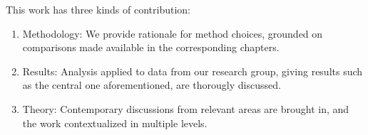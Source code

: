 This work has three kinds of contribution: 
\begin{enumerate}
    \item Methodology: We provide rationale for method choices, grounded on comparisons made available in the corresponding chapters. 
    
    \item Results: Analysis applied to data from our research group, giving results such as the central one aforementioned, are thorougly discussed.
    
    \item Theory: Contemporary discussions from relevant areas are brought in, and the work contextualized in multiple levels.
\end{enumerate}


